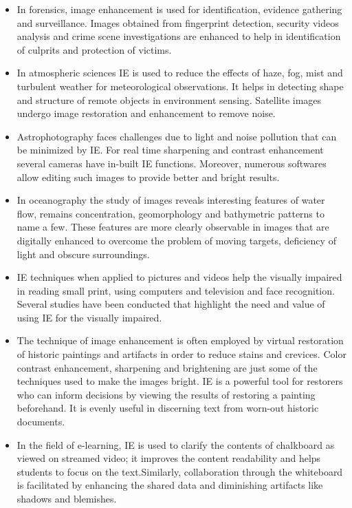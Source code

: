 \begin{itemize}
	\item In forensics, image enhancement is used for identification, evidence gathering and surveillance. Images obtained from fingerprint detection, security videos analysis and crime scene investigations are enhanced to help in identification of culprits and protection of victims.
	\item In atmospheric sciences IE is used to reduce the effects of haze, fog, mist and turbulent weather for meteorological observations. It helps in detecting shape and structure of remote objects in environment sensing. Satellite images undergo image restoration and enhancement to remove noise.
	\item Astrophotography faces challenges due to light and noise pollution that can be minimized by IE. For real time sharpening and contrast enhancement several cameras have in-built IE functions. Moreover, numerous softwares allow editing such images to provide better and bright results.
	\item In oceanography the study of images reveals interesting features of water flow, remains concentration, geomorphology and bathymetric patterns to name a few. These features are more clearly observable in images that are digitally enhanced to overcome the problem of moving targets, deficiency of light and obscure surroundings.
	\item IE techniques when applied to pictures and videos help the visually impaired in reading small print, using computers and television and face recognition. Several studies have been conducted that highlight the need and value of using IE for the visually impaired.
	\item The technique of image enhancement is often employed by virtual restoration of historic paintings and artifacts in order to reduce stains and crevices. Color contrast enhancement, sharpening and brightening are just some of the techniques used to make the images bright. IE is a powerful tool for restorers who can inform decisions by viewing the results of restoring a painting beforehand. It is evenly useful in discerning text from worn-out historic documents.
	\item In the field of e-learning, IE is used to clarify the contents of chalkboard as viewed on streamed video; it improves the content readability and helps students to focus on the text.Similarly, collaboration through the whiteboard is facilitated by enhancing the shared data and diminishing artifacts like shadows and blemishes.

\end{itemize}
